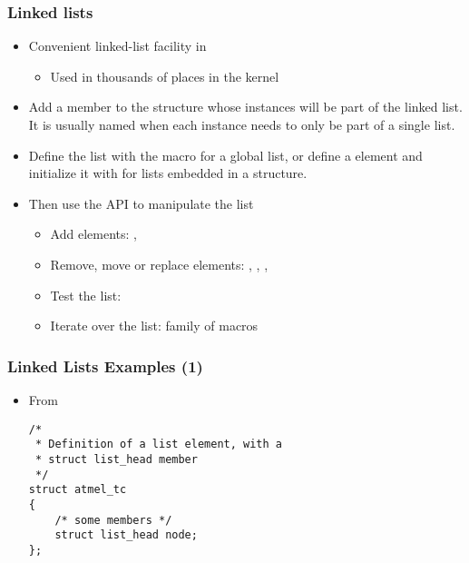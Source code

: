 \begin{frame}
  \frametitle{Linked lists}
  \begin{itemize}
  \item Convenient linked-list facility in 
    \begin{itemize}
    \item Used in thousands of places in the kernel
    \end{itemize}
  \item Add a  member to the structure whose
    instances will be part of the linked list. It is usually named
     when each instance needs to only be part of a single
    list.
  \item Define the list with the  macro for a global
    list, or define a  element and initialize
    it with  for lists embedded in a structure.
  \item Then use the  API to manipulate the list
    \begin{itemize}
    \item Add elements: , 
    \item Remove, move or replace elements: ,
      , ,
    \item Test the list: 
    \item Iterate over the list:  family of macros
    \end{itemize}
  \end{itemize}
\end{frame}

\begin{frame}[fragile]
  \frametitle{Linked Lists Examples (1)}
  \begin{itemize}
  \item From 
\begin{verbatim}
/*
 * Definition of a list element, with a
 * struct list_head member
 */
struct atmel_tc
{
    /* some members */
    struct list_head node;
};
\end{verbatim}
\end{itemize}
\end{frame}

